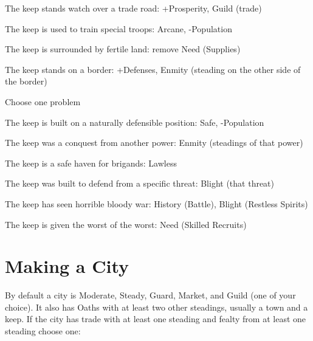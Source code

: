          
\item The keep stands watch over a trade road: +Prosperity, Guild (trade)

         
\item The keep is used to train special troops: Arcane, -Population

         
\item The keep is surrounded by fertile land: remove Need (Supplies)

         
\item The keep stands on a border: +Defenses, Enmity (steading on the other side of the border)

       
\stopitemize
       

Choose one problem

       
\startitemize[1,packed]
         
\item The keep is built on a naturally defensible position: Safe, -Population

         
\item The keep was a conquest from another power: Enmity (steadings of that power)

         
\item The keep is a safe haven for brigands: Lawless

         
\item The keep was built to defend from a specific threat: Blight (that threat)

         
\item The keep has seen horrible bloody war: History (Battle), Blight (Restless Spirits)

         
\item The keep is given the worst of the worst: Need (Skilled Recruits)

       
\stopitemize
       
\section{Making a City}   
       

By default a city is Moderate, Steady, Guard, Market, and Guild (one of your choice). It also has Oaths with at least two other steadings, usually a town and a keep. If the city has trade with at least one steading and fealty from at least one steading choose one:

       
\startitemize[1,packed]
         
